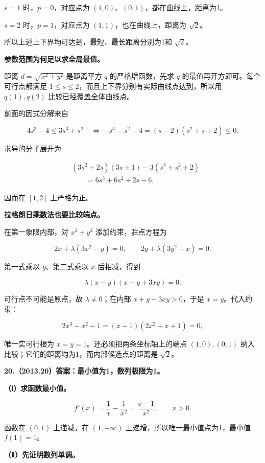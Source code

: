 \documentclass[UTF8,11pt,fontset=windows]{ctexart}
\begin{document}
$s=1$ 时，$p=0$，对应点为 $(1,0)$、$(0,1)$，都在曲线上，距离为1。

$s=2$ 时，$p=1$，对应点为 $(1,1)$，也在曲线上，距离为 $\sqrt2$。

所以上述上下界均可达到，最短、最长距离分别为1和 $\sqrt2$。

\textbf{参数范围为何足以求全局最值。}

距离 $d=\sqrt{x^2+y^2}$ 是距离平方 $q$ 的严格增函数，先求 $q$ 的最值再开方即可。每个可行点都满足 $1\le s\le2$，而且上下界分别有实际曲线点达到，所以用 $q(1),q(2)$ 比较已经覆盖全体曲线点。

前面的因式分解来自

$$
4s^3-4\le3s^3+s^2
\quad\Longleftrightarrow\quad
s^3-s^2-4=(s-2)(s^2+s+2)\le0.
$$

求导的分子展开为

$$
\begin{aligned}
&(3s^2+2s)(3s+1)-3(s^3+s^2+2)\\
&\qquad=6s^3+6s^2+2s-6,
\end{aligned}
$$

因而在 $[1,2]$ 上严格为正。

\textbf{拉格朗日乘数法也要比较端点。}

在第一象限内部，对 $x^2+y^2$ 添加约束，驻点方程为

$$
2x+\lambda(3x^2-y)=0,\qquad
2y+\lambda(3y^2-x)=0.
$$

第一式乘以 $y$、第二式乘以 $x$ 后相减，得到

$$
\lambda(x-y)(x+y+3xy)=0.
$$

可行点不可能是原点，故 $\lambda\ne0$；在内部 $x+y+3xy>0$，于是 $x=y$。代入约束：

$$
2x^3-x^2-1=(x-1)(2x^2+x+1)=0,
$$

唯一实可行根为 $x=y=1$。还必须把两条坐标轴上的端点 $(1,0),(0,1)$ 纳入比较；它们的距离均为1，而内部候选点的距离是 $\sqrt2$。

\clearpage

\textbf{20.（2013.20）答案：最小值为1，数列极限为1。}

\textbf{（Ⅰ）求函数最小值。}

$$
f'(x)=\frac1x-\frac1{x^2}=\frac{x-1}{x^2},\qquad x>0.
$$

函数在 $(0,1)$ 上递减，在 $(1,+\infty)$ 上递增，所以唯一最小值点为1，最小值 $f(1)=1$。

\textbf{（Ⅱ）先证明数列单调。}
\end{document}
